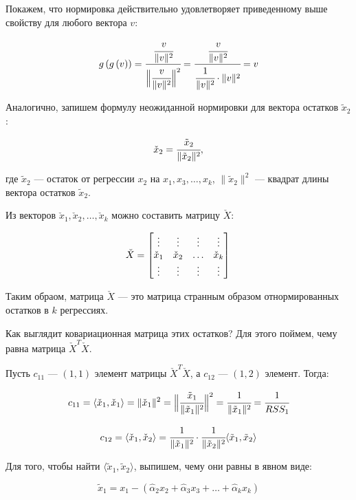 \documentclass[12pt]{article} %
\theoremstyle{definition} %
\begin{document}
Покажем, что нормировка действительно удовлетворяет приведенному выше свойству для любого вектора $v$:

\[
g \left(g \left(v \right) \right) = 
\cfrac
    {\cfrac{v}{\lVert v \rVert^2}}
    {\Big\lVert \cfrac{v}{\lVert v \rVert^2}\Big\rVert^2} 
= \cfrac
    {\cfrac{v}{\lVert v \rVert^2}}
    {\cfrac{1}{\lVert v \rVert^2} \cdot \lVert v \rVert^2}
= v
\]

Аналогично, запишем формулу неожиданной нормировки для вектора остатков $\tilde x_2$:

\[
\check x_2 = \cfrac{\tilde x_2}{\lVert \tilde x_2 \rVert^2},
\]

где $\tilde x_2$ — остаток от регрессии $x_2$ на $x_1, x_3, \dots, x_k$, $\| \tilde x_2 \|^2$ — квадрат длины вектора остатков $\tilde x_2$.

Из векторов $\check x_1, \check x_2, \dots, \check x_k$ можно составить матрицу $\check X$:

\[
\check X = 
        \begin{bmatrix}
           \vdots & \vdots & \vdots & \vdots \\
           \check x_1 & \check x_2 & \dots & \check x_k  \\
           \vdots & \vdots & \vdots & \vdots \\
         \end{bmatrix} \\
\]

Таким обраом, матрица $\check X$ — это матрица странным образом отнормированных остатков в $k$ регрессиях.

Как выглядит ковариационная матрица этих остатков? Для этого поймем, чему равна матрица $\check X^T \check X$. 

Пусть $c_{11}$ —  $(1, 1)$ элемент матрицы $\check X^T \check X$, а $c_{12}$ — $(1,2)$ элемент. Тогда:

\[ 
c_{11} = \langle \check x_1, \check x_1 \rangle = \lVert \check x_1 \rVert^2 = \Big\lVert \cfrac{\tilde x_1}{\lVert \tilde x_1 \rVert^2}  \Big\rVert^2 = \cfrac{1}{\lVert \tilde x_1 \rVert^2} = \cfrac{1}{RSS_1} 
\] 

\[
 c_{12} = \langle \check x_1, \check x_2 \rangle = \cfrac{1}{\lVert \tilde x_1 \rVert^2} \cdot \cfrac{1}{\lVert \tilde x_2 \rVert^2} \langle \tilde x_1, \tilde x_2 \rangle
\] 

Для того, чтобы найти $\langle \tilde x_1, \tilde x_2 \rangle $, выпишем, чему они равны в явном виде:

\[ 
\tilde x_1 = x_1 - (\hat \alpha_2 x_2 + \hat \alpha_3 x_3 + \ldots + \hat \alpha_k x_k) 
\]
\end{document}
